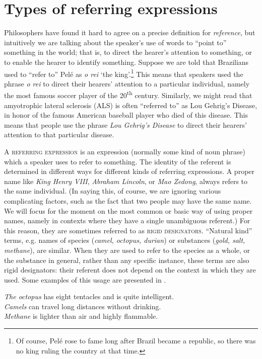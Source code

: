 \section{Types of referring expressions}\label{sec:2.3}

Philosophers have found it hard to agree on a precise definition for \textit{reference}, but intuitively we are talking about the speaker’s use of words to “point to” something in the world; that is, to direct the hearer’s attention to something, or to enable the hearer to identify something. Suppose we are told that Brazilians used to “refer to” Pelé as \textit{o rei} ‘the king’.\footnote{Of course, Pelé rose to fame long after Brazil became a republic, so there was no king ruling the country at that time.} This means that speakers used the phrase \textit{o rei} to direct their hearers’ attention to a particular individual, namely the most famous soccer player of the 20\textsuperscript{th} century. Similarly, we might read that amyotrophic lateral sclerosis (ALS) is often “referred to” as Lou Gehrig’s Disease, in honor of the famous American baseball player who died of this disease. This means that people use the phrase \textit{Lou Gehrig’s Disease} to direct their hearers’ attention to that particular disease.



A \textsc{referring expression} is an expression (normally some kind of noun phrase) which a speaker uses to refer to something. The identity of the referent is determined in different ways for different kinds of referring expressions. A proper name like \textit{King Henry VIII}, \textit{Abraham Lincoln}, or \textit{Mao Zedong}, always refers to the same individual. (In saying this, of course, we are ignoring various complicating factors, such as the fact that two people may have the same name. We will focus for the moment on the most common or basic way of using proper names, namely in contexts where they have a single unambiguous referent.) For this reason, they are sometimes referred to as \textsc{rigid designators}. “Natural kind” terms, e.g. names of species (\textit{camel, octopus, durian}) or substances (\textit{gold, salt, methane}), are similar. When they are used to refer to the species as a whole, or the substance in general, rather than any specific instance, these terms are also rigid designators: their referent does not depend on the context in which they are used. Some examples of this usage are presented in .


\ea \label{ex:2.3}
\ea \textit{The octopus} has eight tentacles and is quite intelligent.\\
\ex \textit{Camels} can travel long distances without drinking.\\
\ex \textit{Methane} is lighter than air and highly flammable.
\z
\z


